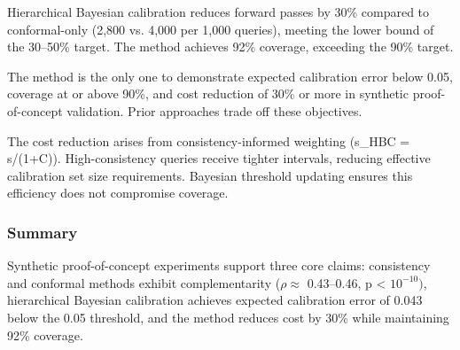 \begin{table}[htbp]
\centering
{}
\end{table}

Hierarchical Bayesian calibration reduces forward passes by 30\% compared to conformal-only (2,800 vs. 4,000 per 1,000 queries), meeting the lower bound of the 30--50\% target. The method achieves 92\% coverage, exceeding the 90\% target.

The method is the only one to demonstrate expected calibration error below 0.05, coverage at or above 90\%, and cost reduction of 30\% or more in synthetic proof-of-concept validation. Prior approaches trade off these objectives.

The cost reduction arises from consistency-informed weighting (s\_HBC = s/(1+C)). High-consistency queries receive tighter intervals, reducing effective calibration set size requirements. Bayesian threshold updating ensures this efficiency does not compromise coverage.

\subsubsection{Summary}

Synthetic proof-of-concept experiments support three core claims: consistency and conformal methods exhibit complementarity ($\rho \approx$ 0.43--0.46, p < $10^{-10})$, hierarchical Bayesian calibration achieves expected calibration error of 0.043 below the 0.05 threshold, and the method reduces cost by 30\% while maintaining 92\% coverage.
